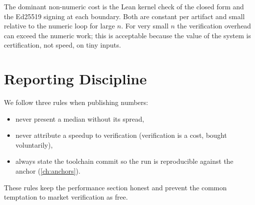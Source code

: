 The dominant non-numeric cost is the Lean kernel check of the closed form
and the Ed25519 signing at each boundary. Both are constant per artifact
and small relative to the numeric loop for large $n$. For very small $n$
the verification overhead can exceed the numeric work; this is acceptable
because the value of the system is certification, not speed, on tiny
inputs.

\section{Reporting Discipline}
\label{sec:perf-disc}

We follow three rules when publishing numbers:
\begin{itemize}
  \item never present a median without its spread,
  \item never attribute a speedup to verification (verification is a cost,
        bought voluntarily),
  \item always state the toolchain commit so the run is reproducible
        against the anchor (\cref{ch:anchors}).
\end{itemize}
These rules keep the performance section honest and prevent the common
temptation to market verification as free.
